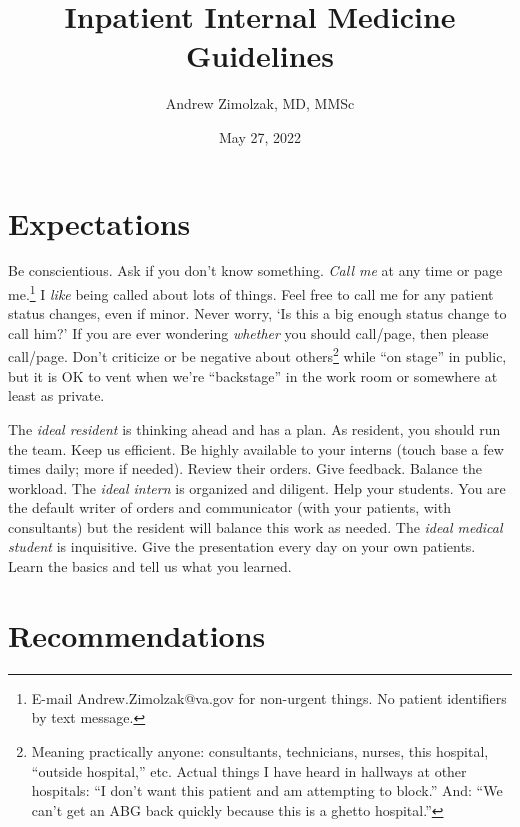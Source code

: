 \documentclass{tufte-handout}
\title{Inpatient Internal Medicine Guidelines}
\author{Andrew Zimolzak, MD, MMSc}
\date{May 27, 2022}
\begin{document}
\maketitle

\section{Expectations}

Be conscientious. Ask if you don't know something. \emph{Call me} at
any time or page me.\footnote{E-mail
Andrew.Zimolzak@va.gov for non-urgent things. No patient identifiers
by text message.} I \emph{like} being called about lots of things.
Feel free to call me for any patient status changes, even if minor.
Never worry, `Is this a big enough status change to call him?' If you
are ever wondering \emph{whether} you should call/page, then please
call/page. Don't criticize or be negative about
others\footnote{Meaning practically anyone: consultants, technicians,
nurses, this hospital, ``outside hospital,'' etc. Actual things I have
heard in hallways at other hospitals: ``I don't want this patient and
am attempting to block.'' And: ``We can't get an ABG back quickly
because this is a ghetto hospital.''} while ``on stage'' in public,
but it is OK to vent when we're ``backstage'' in the work room or
somewhere at least as private.

The \emph{ideal resident} is thinking ahead and has a plan. As
resident, you should run the team. Keep us efficient. Be highly
available to your interns (touch base a few times daily; more if
needed). Review their orders. Give feedback. Balance the workload. The
\emph{ideal intern} is organized and diligent. Help your students. You
are the default writer of orders and communicator (with your patients,
with consultants) but the resident will balance this work as needed.
The \emph{ideal medical student} is inquisitive. Give the presentation
every day on your own patients. Learn the basics and tell us what you
learned.




\section{Recommendations}

\end{document}

